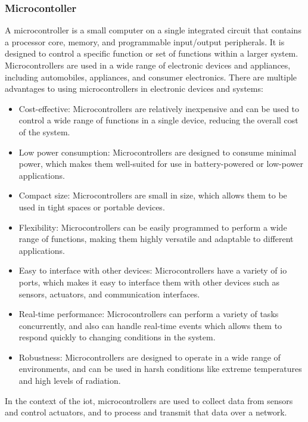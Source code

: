 \subsubsection{Microcontoller}
A microcontroller is a small computer on a single integrated circuit that contains a processor core, memory, and programmable input/output peripherals. It is designed to control a specific function or set of functions within a larger system. Microcontrollers are used in a wide range of electronic devices and appliances, including automobiles, appliances, and consumer electronics.
There are multiple advantages to using microcontrollers in electronic devices and systems:
\begin{itemize}
\item Cost-effective: Microcontrollers are relatively inexpensive and can be used to control a wide range of functions in a single device, reducing the overall cost of the system.
\item Low power consumption: Microcontrollers are designed to consume minimal power, which makes them well-suited for use in battery-powered or low-power applications.
\item Compact size: Microcontrollers are small in size, which allows them to be used in tight spaces or portable devices.
\item Flexibility: Microcontrollers can be easily programmed to perform a wide range of functions, making them highly versatile and adaptable to different applications.
\item Easy to interface with other devices: Microcontrollers have a variety of \gls{io} ports, which makes it easy to interface them with other devices such as sensors, actuators, and communication interfaces.
\item Real-time performance: Microcontrollers can perform a variety of tasks concurrently, and also can handle real-time events which allows them to respond quickly to changing conditions in the system.
\item Robustness: Microcontrollers are designed to operate in a wide range of environments, and can be used in harsh conditions like extreme temperatures and high levels of radiation.
\end{itemize}
In the context of the \gls{iot}, microcontrollers are used to collect data from sensors and control actuators, and to process and transmit that data over a network.
